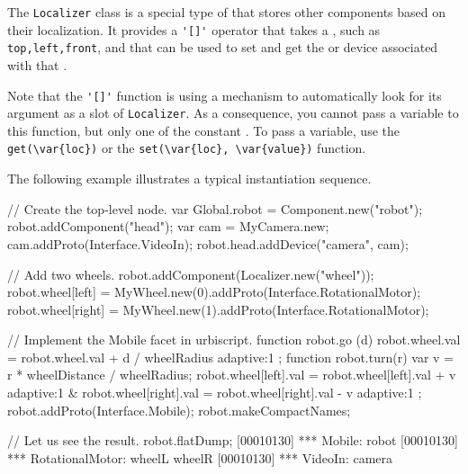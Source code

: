 
The \lstinline{Localizer} class is a special type of 
that stores other components based on their localization. It provides a
\lstinline{'[]'} operator that takes a , such as
\lstinline|top,left,front|, and that can be used to set and get the
 or device associated with that
.

Note that the \lstinline{'[]'} function is using a mechanism to
automatically look for its argument as a slot of \lstinline{Localizer}. As a
consequence, you cannot pass a variable to this function, but only one of
the constant .  To pass a variable, use the
\lstinline|get(\var{loc})| or the \lstinline|set(\var{loc}, \var{value})|
function.

The following example illustrates a typical instantiation sequence.

\begin{urbiunchecked}
// Create the top-level node.
var Global.robot = Component.new("robot");
robot.addComponent("head");
var cam = MyCamera.new;
cam.addProto(Interface.VideoIn);
robot.head.addDevice("camera", cam);

// Add two wheels.
robot.addComponent(Localizer.new("wheel"));
robot.wheel[left] = MyWheel.new(0).addProto(Interface.RotationalMotor);
robot.wheel[right] = MyWheel.new(1).addProto(Interface.RotationalMotor);

// Implement the Mobile facet in urbiscript.
function robot.go (d)
{
  robot.wheel.val = robot.wheel.val + d / wheelRadius adaptive:1
};
function robot.turn(r)
{
  var v = r * wheelDistance / wheelRadius;
  robot.wheel[left].val = robot.wheel[left].val + v adaptive:1 &
  robot.wheel[right].val = robot.wheel[right].val - v adaptive:1
};
robot.addProto(Interface.Mobile);
robot.makeCompactNames;

// Let us see the result.
robot.flatDump;
[00010130] *** Mobile: robot
[00010130] *** RotationalMotor: wheelL wheelR
[00010130] *** VideoIn: camera
\end{urbiunchecked}


